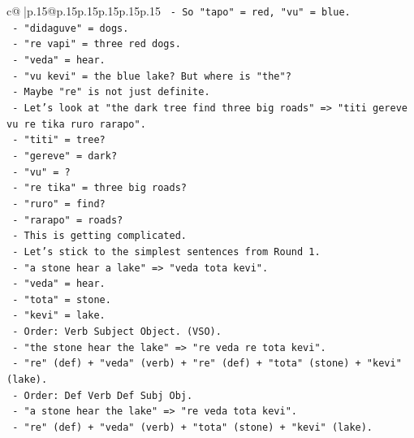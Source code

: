 \documentclass{article}
\begin{document}
{\begin{supertabular}{c@{$\;$}|p{.15\linewidth}@{}p{.15\linewidth}p{.15\linewidth}p{.15\linewidth}p{.15\linewidth}p{.15\linewidth}}
{{{\texttt{               {-} So "tapo" = red, "vu" = blue.} \\
\texttt{               {-} "didaguve" = dogs.} \\
\texttt{               {-} "re vapi" = three red dogs.} \\
\texttt{               {-} "veda" = hear.} \\
\texttt{               {-} "vu kevi" = the blue lake? But where is "the"?} \\
\texttt{               {-} Maybe "re" is not just definite.} \\
\texttt{               {-} Let's look at "the dark tree find three big roads" => "titi gereve vu re tika ruro rarapo".} \\
\texttt{                 {-} "titi" = tree?} \\
\texttt{                 {-} "gereve" = dark?} \\
\texttt{                 {-} "vu" = ?} \\
\texttt{                 {-} "re tika" = three big roads?} \\
\texttt{                 {-} "ruro" = find?} \\
\texttt{                 {-} "rarapo" = roads?} \\
\texttt{                 {-} This is getting complicated.} \\
\texttt{                 {-} Let's stick to the simplest sentences from Round 1.} \\
\texttt{                 {-} "a stone hear a lake" => "veda tota kevi".} \\
\texttt{                   {-} "veda" = hear.} \\
\texttt{                   {-} "tota" = stone.} \\
\texttt{                   {-} "kevi" = lake.} \\
\texttt{                   {-} Order: Verb Subject Object. (VSO).} \\
\texttt{                 {-} "the stone hear the lake" => "re veda re tota kevi".} \\
\texttt{                   {-} "re" (def) + "veda" (verb) + "re" (def) + "tota" (stone) + "kevi" (lake).} \\
\texttt{                   {-} Order: Def Verb Def Subj Obj.} \\
\texttt{                 {-} "a stone hear the lake" => "re veda tota kevi".} \\
\texttt{                   {-} "re" (def) + "veda" (verb) + "tota" (stone) + "kevi" (lake).} \\
}}}
\end{supertabular}}
\end{document}
